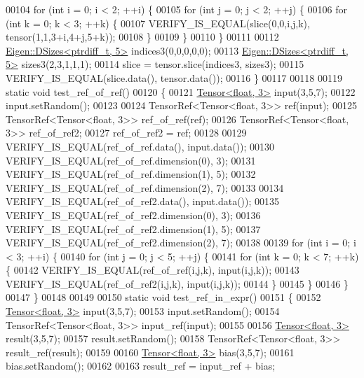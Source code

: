 \begin{DoxyCode}
00104   \textcolor{keywordflow}{for} (\textcolor{keywordtype}{int} i = 0; i < 2; ++i) \{
00105     \textcolor{keywordflow}{for} (\textcolor{keywordtype}{int} j = 0; j < 2; ++j) \{
00106       \textcolor{keywordflow}{for} (\textcolor{keywordtype}{int} k = 0; k < 3; ++k) \{
00107         VERIFY\_IS\_EQUAL(slice(0,0,i,j,k), tensor(1,1,3+i,4+j,5+k));
00108       \}
00109     \}
00110   \}
00111 
00112   \hyperlink{struct_eigen_1_1_d_sizes}{Eigen::DSizes<ptrdiff\_t, 5>} indices3(0,0,0,0,0);
00113   \hyperlink{struct_eigen_1_1_d_sizes}{Eigen::DSizes<ptrdiff\_t, 5>} sizes3(2,3,1,1,1);
00114   slice = tensor.slice(indices3, sizes3);
00115   VERIFY\_IS\_EQUAL(slice.data(), tensor.data());
00116 \}
00117 
00118 
00119 \textcolor{keyword}{static} \textcolor{keywordtype}{void} test\_ref\_of\_ref()
00120 \{
00121   \hyperlink{class_eigen_1_1_tensor}{Tensor<float, 3>} input(3,5,7);
00122   input.setRandom();
00123 
00124   TensorRef<Tensor<float, 3>> ref(input);
00125   TensorRef<Tensor<float, 3>> ref\_of\_ref(ref);
00126   TensorRef<Tensor<float, 3>> ref\_of\_ref2;
00127   ref\_of\_ref2 = ref;
00128 
00129   VERIFY\_IS\_EQUAL(ref\_of\_ref.data(), input.data());
00130   VERIFY\_IS\_EQUAL(ref\_of\_ref.dimension(0), 3);
00131   VERIFY\_IS\_EQUAL(ref\_of\_ref.dimension(1), 5);
00132   VERIFY\_IS\_EQUAL(ref\_of\_ref.dimension(2), 7);
00133 
00134   VERIFY\_IS\_EQUAL(ref\_of\_ref2.data(), input.data());
00135   VERIFY\_IS\_EQUAL(ref\_of\_ref2.dimension(0), 3);
00136   VERIFY\_IS\_EQUAL(ref\_of\_ref2.dimension(1), 5);
00137   VERIFY\_IS\_EQUAL(ref\_of\_ref2.dimension(2), 7);
00138 
00139   \textcolor{keywordflow}{for} (\textcolor{keywordtype}{int} i = 0; i < 3; ++i) \{
00140     \textcolor{keywordflow}{for} (\textcolor{keywordtype}{int} j = 0; j < 5; ++j) \{
00141       \textcolor{keywordflow}{for} (\textcolor{keywordtype}{int} k = 0; k < 7; ++k) \{
00142         VERIFY\_IS\_EQUAL(ref\_of\_ref(i,j,k), input(i,j,k));
00143         VERIFY\_IS\_EQUAL(ref\_of\_ref2(i,j,k), input(i,j,k));
00144      \}
00145     \}
00146   \}
00147 \}
00148 
00149 
00150 \textcolor{keyword}{static} \textcolor{keywordtype}{void} test\_ref\_in\_expr()
00151 \{
00152   \hyperlink{class_eigen_1_1_tensor}{Tensor<float, 3>} input(3,5,7);
00153   input.setRandom();
00154   TensorRef<Tensor<float, 3>> input\_ref(input);
00155 
00156   \hyperlink{class_eigen_1_1_tensor}{Tensor<float, 3>} result(3,5,7);
00157   result.setRandom();
00158   TensorRef<Tensor<float, 3>> result\_ref(result);
00159 
00160   \hyperlink{class_eigen_1_1_tensor}{Tensor<float, 3>} bias(3,5,7);
00161   bias.setRandom();
00162 
00163   result\_ref = input\_ref + bias;

\end{DoxyCode}
